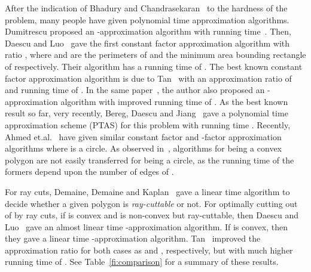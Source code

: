 \documentclass{llncs}
\begin{document}
After the indication of Bhadury and Chandrasekaran~\cite{ab} to
the hardness of the problem, many people have given polynomial time approximation algorithms.
Dumitrescu proposed an -approximation algorithm with
 running time~\cite{ae,ad}. Then, Daescu and
Luo~\cite{af} gave the first constant factor approximation
algorithm with ratio ,
where  and  are the perimeters of  and the minimum area bounding rectangle of  respectively.
Their algorithm has a running time of
. The best known constant factor
approximation algorithm is due to Tan~\cite{ac} with an approximation ratio of
 and running time of . In the same
paper~\cite{ac}, the author also proposed an -approximation
algorithm with improved running time of .
As the best known result so far, very recently, Bereg, Daescu and
Jiang~\cite{ah} gave a polynomial time approximation scheme (PTAS)
for this problem with running time .
Recently, Ahmed et.al.~\cite{AIH} have given similar constant factor and -factor
approximation algorithms where  is a circle. 
As observed in~\cite{AIH}, algorithms for  being a convex polygon are not
easily transferred for  being a circle, as the running time of the
formers depend upon the number of edges of .


For ray cuts, Demaine, Demaine and Kaplan~\cite{ag} gave a linear time algorithm to decide
whether a given polygon  is \emph{ray-cuttable} or not.
For optimally cutting  out of  by ray cuts, 
if  is convex and  is non-convex but ray-cuttable, 
then Daescu and Luo~\cite{af} gave an almost linear time
-approximation algorithm.
If  is convex, then they gave a linear time -approximation algorithm.
Tan~\cite{ac} improved the approximation ratio for both cases
as  and , respectively, but with much higher running time of .
See Table~\ref{fi:comparison} for a summary of these results.
\end{document}
